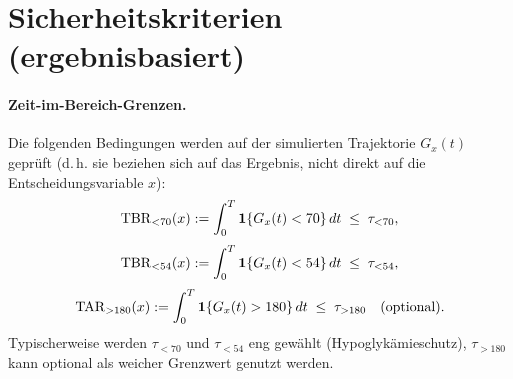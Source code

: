 \section{Sicherheitskriterien (ergebnisbasiert)}

\paragraph{Zeit-im-Bereich-Grenzen.} Die folgenden Bedingungen werden auf der simulierten Trajektorie \(G_x(t)\) geprüft (d.\,h. sie beziehen sich auf das Ergebnis, nicht direkt auf die Entscheidungsvariable \(x\)):
\[
\mathrm{TBR}_{<70}(x) := \int_0^T \mathbf{1}\{G_x(t)<70\}\,dt \;\le\; \tau_{<70},
\]
\[
\mathrm{TBR}_{<54}(x) := \int_0^T \mathbf{1}\{G_x(t)<54\}\,dt \;\le\; \tau_{<54},
\]
\[
\mathrm{TAR}_{>180}(x) := \int_0^T \mathbf{1}\{G_x(t)>180\}\,dt \;\le\; \tau_{>180}\quad \text{(optional)}.
\]
\noindent Typischerweise werden \(\tau_{<70}\) und \(\tau_{<54}\) eng gewählt (Hypoglykämieschutz), \(\tau_{>180}\) kann optional als weicher Grenzwert genutzt werden.